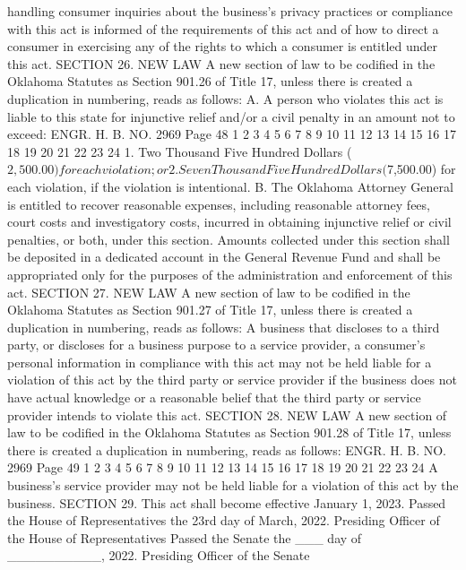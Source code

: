 handling consumer inquiries about the business's privacy practices
or compliance with this act is informed of the requirements of this
act and of how to direct a consumer in exercising any of the rights
to which a consumer is entitled under this act.
SECTION 26. NEW LAW A new section of law to be codified
in the Oklahoma Statutes as Section 901.26 of Title 17, unless there
is created a duplication in numbering, reads as follows:
A. A person who violates this act is liable to this state for
injunctive relief and/or a civil penalty in an amount not to exceed:
ENGR. H. B. NO. 2969 Page 48
1
2
3
4
5
6
7
8
9
10
11
12
13
14
15
16
17
18
19
20
21
22
23
24
1. Two Thousand Five Hundred Dollars ($2,500.00) for each
violation; or
2. Seven Thousand Five Hundred Dollars ($7,500.00) for each
violation, if the violation is intentional.
B. The Oklahoma Attorney General is entitled to recover
reasonable expenses, including reasonable attorney fees, court costs
and investigatory costs, incurred in obtaining injunctive relief or
civil penalties, or both, under this section. Amounts collected
under this section shall be deposited in a dedicated account in the
General Revenue Fund and shall be appropriated only for the purposes
of the administration and enforcement of this act.
SECTION 27. NEW LAW A new section of law to be codified
in the Oklahoma Statutes as Section 901.27 of Title 17, unless there
is created a duplication in numbering, reads as follows:
A business that discloses to a third party, or discloses for a
business purpose to a service provider, a consumer's personal
information in compliance with this act may not be held liable for a
violation of this act by the third party or service provider if the
business does not have actual knowledge or a reasonable belief that
the third party or service provider intends to violate this act.
SECTION 28. NEW LAW A new section of law to be codified
in the Oklahoma Statutes as Section 901.28 of Title 17, unless there
is created a duplication in numbering, reads as follows:
ENGR. H. B. NO. 2969 Page 49
1
2
3
4
5
6
7
8
9
10
11
12
13
14
15
16
17
18
19
20
21
22
23
24
A business's service provider may not be held liable for a
violation of this act by the business.
SECTION 29. This act shall become effective January 1, 2023.
Passed the House of Representatives the 23rd day of March, 2022.
Presiding Officer of the House
of Representatives
Passed the Senate the ___ day of __________, 2022.
Presiding Officer of the Senate